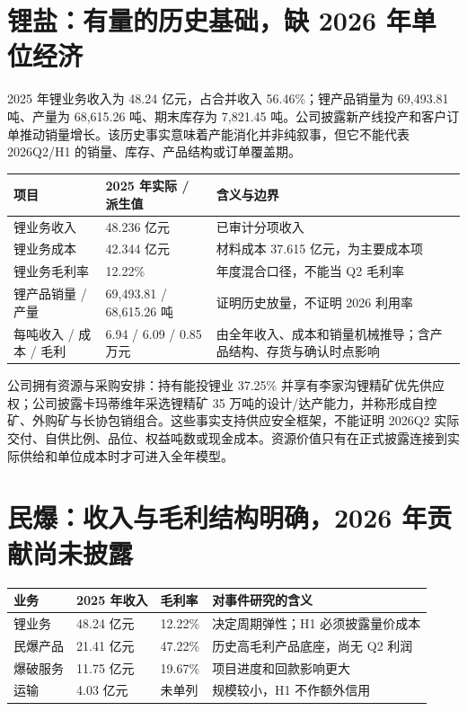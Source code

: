 \section{锂盐：有量的历史基础，缺 2026 年单位经济}

2025 年锂业务收入为 48.24 亿元，占合并收入 56.46\%；锂产品销量为 69,493.81 吨、产量为 68,615.26 吨、期末库存为 7,821.45 吨。公司披露新产线投产和客户订单推动销量增长。该历史事实意味着产能消化并非纯叙事，但它不能代表 2026Q2/H1 的销量、库存、产品结构或订单覆盖期。

\begin{exhibitbox}
\begin{tabularx}{\exhibitboxwidth}{L{3.4cm}R{3.0cm}X}
\toprule
项目 & 2025 年实际 / 派生值 & 含义与边界 \\
\midrule
锂业务收入 & 48.236 亿元 & 已审计分项收入 \\
锂业务成本 & 42.344 亿元 & 材料成本 37.615 亿元，为主要成本项 \\
锂业务毛利率 & 12.22\% & 年度混合口径，不能当 Q2 毛利率 \\
锂产品销量 / 产量 & 69,493.81 / 68,615.26 吨 & 证明历史放量，不证明 2026 利用率 \\
每吨收入 / 成本 / 毛利 & 6.94 / 6.09 / 0.85 万元 & 由全年收入、成本和销量机械推导；含产品结构、存货与确认时点影响 \\
\bottomrule
\end{tabularx}
\end{exhibitbox}

公司拥有资源与采购安排：持有能投锂业 37.25\% 并享有李家沟锂精矿优先供应权；公司披露卡玛蒂维年采选锂精矿 35 万吨的设计/达产能力，并称形成自控矿、外购矿与长协包销组合。这些事实支持供应安全框架，不能证明 2026Q2 实际交付、自供比例、品位、权益吨数或现金成本。资源价值只有在正式披露连接到实际供给和单位成本时才可进入全年模型。

\section{民爆：收入与毛利结构明确，2026 年贡献尚未披露}

\begin{exhibitbox}[2025 年双主业收入和民爆分项结构]
\begin{tabularx}{\exhibitboxwidth}{L{3.0cm}R{2.5cm}R{2.3cm}X}
\toprule
业务 & 2025 年收入 & 毛利率 & 对事件研究的含义 \\
\midrule
锂业务 & 48.24 亿元 & 12.22\% & 决定周期弹性；H1 必须披露量价成本 \\
民爆产品 & 21.41 亿元 & 47.22\% & 历史高毛利产品底座，尚无 Q2 利润 \\
爆破服务 & 11.75 亿元 & 19.67\% & 项目进度和回款影响更大 \\
运输 & 4.03 亿元 & 未单列 & 规模较小，H1 不作额外信用 \\
\bottomrule
\end{tabularx}
\end{exhibitbox}

